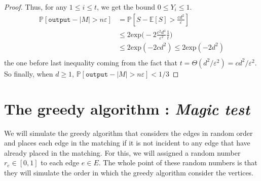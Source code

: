\documentclass{jams-l}
\theoremstyle{definition}
\theoremstyle{remark}
\numberwithin{equation}{section}
\begin{document}
\begin{proof}
Thus, for any $1 \leq i \leq t$, we get the bound $0 \leq Y_i \leq 1$.
\begin{align*}
\mathbb{P}[\texttt{output} - |M| > n\varepsilon] &= \mathbb{P}[S - \mathbb{E}[S] >  \frac{cd^2}{\varepsilon}]\\
	&\leq 2 \mathrm{exp}\Big(-2 \frac{c^2d^4}{\varepsilon^2}\frac{1}{t}\Big) \\
	&\leq 2 \mathrm{exp}(-2 cd^2) \leq 2 \mathrm{exp}(-2 d^2)\\
\end{align*}
the one before last inequality coming from the fact that $t = \Theta(d^2/\varepsilon^2) = cd^2/\varepsilon^2$.\\
So finally, when $d \geq 1$, $\mathbb{P}[\texttt{output} - |M| > n\varepsilon]<1/3$




\end{proof}

\section{The greedy algorithm : \emph{Magic test}}

We will simulate the greedy algorithm that considers the edges in random order and places each edge in the matching if it is not incident to any edge that have already placed in the matching. For this, we will assigned a random number $r_e \in [0,1]$ to each edge $e \in E$. The whole point of these random numbers is that they will simulate the order in which the greedy algorithm consider the vertices. 
\end{document}
